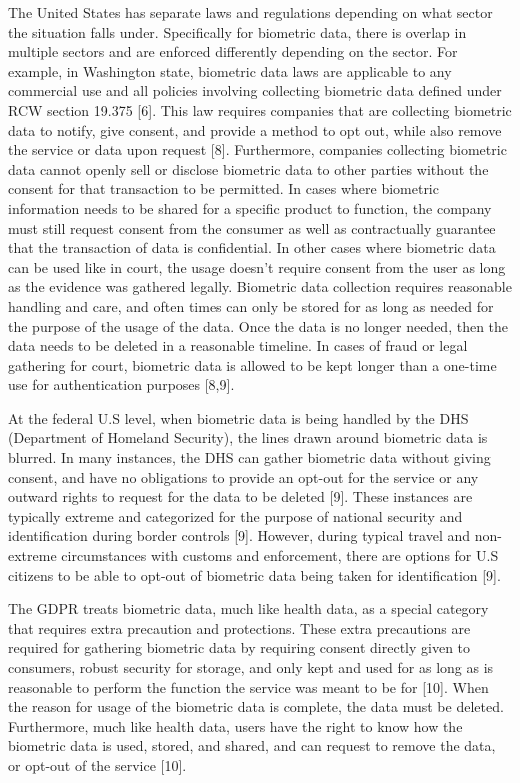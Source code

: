 \documentclass[conference]{IEEEtran}
\begin{document}
The United States has separate laws and regulations depending on what sector the situation falls under. Specifically for biometric data, there is overlap in multiple sectors and are enforced differently depending on the sector. For example, in Washington state, biometric data laws are applicable to any commercial use and all policies involving collecting biometric data defined under RCW section 19.375 [6]. This law requires companies that are collecting biometric data to notify, give consent, and provide a method to opt out, while also remove the service or data upon request [8]. Furthermore, companies collecting biometric data cannot openly sell or disclose biometric data to other parties without the consent for that transaction to be permitted. In cases where biometric information needs to be shared for a specific product to function, the company must still request consent from the consumer as well as contractually guarantee that the transaction of data is confidential. In other cases where biometric data can be used like in court, the usage doesn't require consent from the user as long as the evidence was gathered legally. Biometric data collection requires reasonable handling and care, and often times can only be stored for as long as needed for the purpose of the usage of the data. Once the data is no longer needed, then the data needs to be deleted in a reasonable timeline. In cases of fraud or legal gathering for court, biometric data is allowed to be kept longer than a one-time use for authentication purposes [8,9].

At the federal U.S level, when biometric data is being handled by the DHS (Department of Homeland Security), the lines drawn around biometric data is blurred. In many instances, the DHS can gather biometric data without giving consent, and have no obligations to provide an opt-out for the service or any outward rights to request for the data to be deleted [9]. These instances are typically extreme and categorized for the purpose of national security and identification during border controls [9]. However, during typical travel and non-extreme circumstances with customs and enforcement, there are options for U.S citizens to be able to opt-out of biometric data being taken for identification [9]. 

The GDPR treats biometric data, much like health data, as a special category that requires extra precaution and protections. These extra precautions are required for gathering biometric data by requiring consent directly given to consumers, robust security for storage, and only kept and used for as long as is reasonable to perform the function the service was meant to be for [10]. When the reason for usage of the biometric data is complete, the data must be deleted. Furthermore, much like health data, users have the right to know how the biometric data is used, stored, and shared, and can request to remove the data, or opt-out of the service [10].
\end{document}
